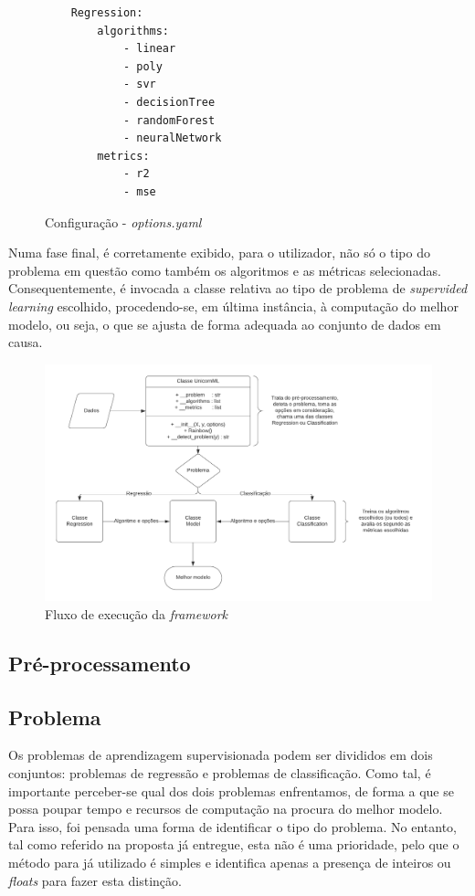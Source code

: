 \documentclass[a4paper]{report}
\begin{document}
{\begin{figure}[H]
\begin{verbatim}
    Regression:
        algorithms:
            - linear
            - poly
            - svr
            - decisionTree
            - randomForest
            - neuralNetwork
        metrics:
            - r2
            - mse
        \end{verbatim}
        \vspace{-5mm}
        \caption{Configuração - \textsl{options.yaml}}
        \label{fig:2}
	\end{figure}

		Numa fase final, é corretamente exibido, para o utilizador, não só o tipo do problema em questão como também os algoritmos e as métricas selecionadas.
		Consequentemente, é invocada a classe relativa ao tipo de problema de \textit{supervided learning} escolhido, procedendo-se, em última instância, à computação do melhor modelo, ou seja, o que se ajusta de forma adequada ao conjunto de dados em causa.

		\begin{figure}[H]
			\centering
			\includegraphics[width=1.0\textwidth]{Images/Diagram.png}
			\caption{Fluxo de execução da \textit{framework}}
			\label{fig:3}
		\end{figure}

        \subsection{Pré-processamento} \label{subsec:Pre-Processing}

		\subsection{Problema} \label{subsec:Problem}
		Os problemas de aprendizagem supervisionada podem ser divididos em dois conjuntos: problemas de regressão e problemas de classificação.
		Como tal, é importante perceber-se qual dos dois problemas enfrentamos, de forma a que se possa poupar tempo e recursos de computação na procura do melhor modelo.
		Para isso, foi pensada uma forma de identificar o tipo do problema. No entanto, tal como referido na proposta já entregue, esta não é uma prioridade,
		pelo que o método para já utilizado é simples e identifica apenas a presença de inteiros ou \textit{floats} para fazer esta distinção.

}
\end{document}
